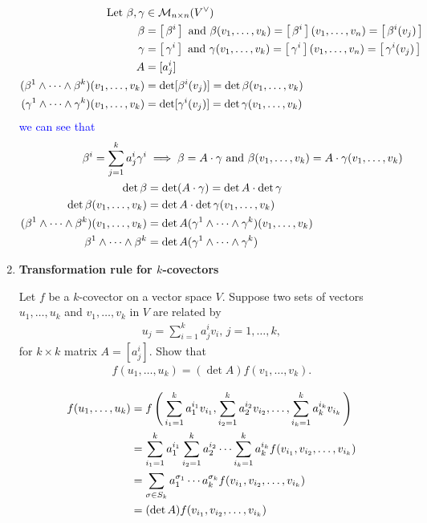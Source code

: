 \documentclass[10pt,a4paper]{report}
\newcommand{\BLUE}[1]{\textcolor{blue}{#1}}
\begin{document}
\begin{enumerate}[label=3.\arabic*.]
	\BLUE{\begin{align*}
		\text{Let } \beta, \gamma &\in \mathcal{M}_{n \times n}(V^\vee) \\
		\beta &= \left [\,  \beta^i  \,\right ] \text{ and } \beta(v_1,\dots,v_k) = \left [\,  \beta^i  \,\right ](v_1,\dots,v_n) = \left [\, \beta^i(v_j) \,\right ]\\
		\gamma &= \left [\,  \gamma^i  \,\right ] \text{ and } \gamma(v_1,\dots,v_k) = \left [\,  \gamma^i  \,\right ](v_1,\dots,v_n) = \left [\, \gamma^i(v_j) \,\right ]\\
		A &= [ a^i_j ] \\
		(\beta^1 \wedge \cdots \wedge \beta^k)(v_1, \dots, v_k) &= \det [ \beta^i(v_j) ] = \det \beta(v_1,\dots,v_k) \\
		(\gamma^1 \wedge \cdots \wedge \gamma^k)(v_1, \dots, v_k) &= \det [ \gamma^i (v_j) ] = \det \gamma(v_1,\dots,v_k)\\
	\end{align*}we can see that 
	\begin{align*}
		\beta^i=\sum_{j=1}^k a^i_j\gamma^i &\implies \beta = A \cdot \gamma \text{ and } \beta(v_1,\dots,v_k) = A \cdot \gamma(v_1,\dots,v_k)\\
		\det\beta &= \det (A \cdot \gamma) = \det A \cdot \det \gamma \\
		\det\beta(v_1,\dots,v_k) &=  \det A \cdot \det \gamma(v_1,\dots,v_k) \\
		(\beta^1 \wedge \cdots \wedge \beta^k)(v_1, \dots, v_k) &=  \det A (\gamma^1 \wedge \cdots \wedge \gamma^k)(v_1, \dots, v_k) \\
		\beta^1 \wedge \cdots \wedge \beta^k &=  \det A (\gamma^1 \wedge \cdots \wedge \gamma^k)
	\end{align*}
	}
	
	\item \textbf{Transformation rule for $k$-covectors}
		
	Let $f$ be a $k$-covector on a vector space $V$.  Suppose two sets of vectors $u_1, \dots, u_k$ and $v_1, \dots, v_k$ in $V$ are related by 
		\begin{align*}
			u_j =\sum_{i=1}^k a_j^iv_i,\, j=1,\dots,k,
		\end{align*}for $k\times k$ matrix $A=[a_j^i]$.  Show that 
		\begin{align*}
			f(u_1,\dots,u_k)=(\det A)f(v_1,\dots, v_k).
		\end{align*}
		
	\BLUE{\begin{align*}
			f(u_1,\dots,u_k) &= f\left (\, \sum_{i_1=1}^k a_1^{i_1}v_{i_1}, \sum_{i_2=1}^k a_2^{i_2}v_{i_2}, \dots, \sum_{{i_k}=1}^k a_k^{i_k}v_{i_k} \,\right ) \\
			&= \sum_{i_1=1}^k a_1^{i_1} \sum_{i_2=1}^k a_2^{i_2} \cdots \sum_{{i_k}=1}^k a_k^{i_k} f(v_{i_1},v_{i_2}, \dots,v_{i_k})\\
			&= \sum_{\sigma \in S_k} a_1^{\sigma_1}  \cdots a_k^{\sigma_k} f(v_{i_1},v_{i_2}, \dots,v_{i_k}) \\
			&= (\det A) f(v_{i_1},v_{i_2}, \dots,v_{i_k})
		\end{align*}	
		}


\end{enumerate}
\end{document}
